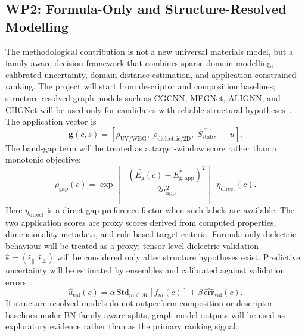 \documentclass[10pt,a4paper]{article}
\newcommand{\eg}{E_{\mathrm{g}}}
\newcommand{\unc}{u}
\newcommand{\stab}{S_{\mathrm{stab}}}
\newcommand{\gapscore}{\rho_{\mathrm{gap}}}
\begin{document}
\subsection{WP2: Formula-Only and Structure-Resolved Modelling}
The methodological contribution is not a new universal materials model, but a family-aware decision framework that combines sparse-domain modelling, calibrated uncertainty, domain-distance estimation, and application-constrained ranking. The project will start from descriptor and composition baselines; structure-resolved graph models such as CGCNN, MEGNet, ALIGNN, and CHGNet will be used only for candidates with reliable structural hypotheses~\cite{ong2013_pymatgen,xie2018_cgcnn,chen2019_megnet,choudhary2021_alignn,deng2023_chgnet}. The application vector is
\[
  \mathbf{g}(c,s)=
  [\rho_{\mathrm{UV/WBG}},\;\rho_{\mathrm{dielectric/2D}},\;
  \hat{\stab},\;-\unc].
\]
The band-gap term will be treated as a target-window score rather than a monotonic objective:
\[
  \gapscore(c)=
  \exp\!\left[-\frac{(\hat{\eg}(c)-E^*_{\mathrm{g,app}})^2}{2\sigma_{\mathrm{app}}^2}\right]
  \cdot\eta_{\mathrm{direct}}(c).
\]
Here $\eta_{\mathrm{direct}}$ is a direct-gap preference factor when such labels are available. The two application scores are proxy scores derived from computed properties, dimensionality metadata, and rule-based target criteria. Formula-only dielectric behaviour will be treated as a proxy; tensor-level dielectric validation $\hat{\boldsymbol{\epsilon}}=(\hat{\epsilon}_{\parallel},\hat{\epsilon}_{\perp})$ will be considered only after structure hypotheses exist. Predictive uncertainty will be estimated by ensembles and calibrated against validation errors~\cite{gal2016_dropout,lakshminarayanan2017_ensembles}:
\[
  \hat{\unc}_{\mathrm{cal}}(c)=
  \alpha\,\mathrm{Std}_{m\in\mathcal{M}}\!\left[f_m(c)\right]+
  \beta\,\widehat{\mathrm{err}}_{\mathrm{val}}(c).
\]
If structure-resolved models do not outperform composition or descriptor baselines under BN-family-aware splits, graph-model outputs will be used as exploratory evidence rather than as the primary ranking signal.
\end{document}
